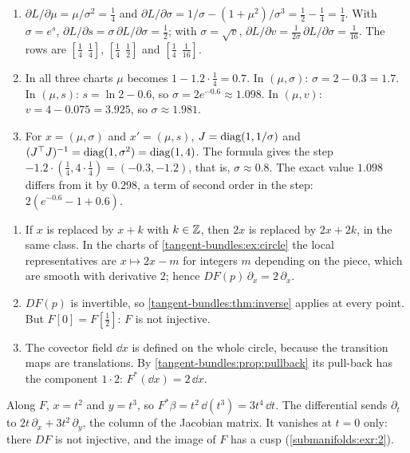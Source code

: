 \begin{enumerate}[nosep]
  \item $\partial L/\partial\mu = \mu/\sigma^2 = \frac14$ and
        $\partial L/\partial\sigma = 1/\sigma - (1 + \mu^2)/\sigma^3
        = \frac12 - \frac14 = \frac14$. With $\sigma = e^s$,
        $\partial L/\partial s = \sigma\,\partial L/\partial\sigma
        = \frac12$; with $\sigma = \sqrt v$,
        $\partial L/\partial v = \frac1{2\sigma}\,\partial L/\partial\sigma
        = \frac1{16}$. The rows are $[\frac14\ \ \frac14]$,
        $[\frac14\ \ \frac12]$ and $[\frac14\ \ \frac1{16}]$.
  \item In all three charts $\mu$ becomes $1 - 1.2\cdot\frac14 = 0.7$.
        In $(\mu, \sigma)$: $\sigma = 2 - 0.3 = 1.7$. In $(\mu, s)$:
        $s = \ln2 - 0.6$, so $\sigma = 2e^{-0.6}\approx1.098$. In
        $(\mu, v)$: $v = 4 - 0.075 = 3.925$, so
        $\sigma\approx1.981$.
  \item For $x = (\mu, \sigma)$ and $x' = (\mu, s)$,
        $J = \operatorname{diag}(1, 1/\sigma)$ and $(J^\top J)^{-1} = \operatorname{diag}(1, \sigma^2)
        = \operatorname{diag}(1, 4)$. The formula gives the step
        $-1.2\cdot(\frac14, 4\cdot\frac14) = (-0.3, -1.2)$, that is,
        $\sigma\approx0.8$. The exact value $1.098$ differs from it by
        $0.298$, a term of second order in the step:
        $2(e^{-0.6} - 1 + 0.6)$.
\end{enumerate}

\begin{enumerate}[nosep]
  \item If $x$ is replaced by $x + k$ with $k\in\mathbb{Z}$, then $2x$ is
        replaced by $2x + 2k$, in the same class. In the charts of
        \cref{tangent-bundles:ex:circle} the local representatives are
        $x\mapsto2x - m$ for integers $m$ depending on the piece, which
        are smooth with derivative $2$; hence
        $DF(p)\,\partial_x = 2\,\partial_x$.
  \item $DF(p)$ is invertible, so \cref{tangent-bundles:thm:inverse}
        applies at every point. But $F[0] = F[\frac12]$: $F$ is not
        injective.
  \item The covector field $\dd x$ is defined on the whole circle,
        because the transition maps are translations. By
        \cref{tangent-bundles:prop:pullback} its pull-back has the
        component $1\cdot2$: $F^*(\dd x) = 2\,\dd x$.
\end{enumerate}

Along $F$, $x = t^2$ and $y = t^3$, so
$F^*\beta = t^2\,\dd(t^3) = 3t^4\,\dd t$. The differential sends
$\partial_t$ to $2t\,\partial_x + 3t^2\,\partial_y$, the column of the
Jacobian matrix. It vanishes at $t = 0$ only: there $DF$ is not
injective, and the image of $F$ has a cusp
(\cref{submanifolds:exr:2}).

